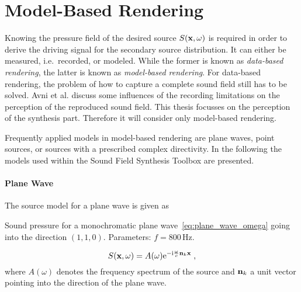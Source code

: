 \newpage

\section{Model-Based Rendering}
\label{sec:model_based_rendering}
%
Knowing the pressure field of the desired source $S(\mathbf{x},\omega)$ is required
in order to derive the driving signal for the secondary source distribution.
It can either be measured, i.e.~recorded, or modeled. While the former is known as
{\em data-based rendering},
the latter is known as {\em model-based rendering}.
For data-based rendering, the problem of how to capture a complete sound field
still has to be solved. Avni et al. discuss some influences of the
recording limitations on the perception of the reproduced sound field.\autocite{Avni2013}
This thesis focusses on the perception of the synthesis part. Therefore it
will consider only model-based rendering.

Frequently applied models in model-based rendering are plane waves, point
sources, or sources with a prescribed complex directivity.
In the following the models used within the Sound Field Synthesis
Toolbox are presented.
%
\paragraph{Plane Wave}
\label{sec:plane_wave}
%
The source model for a plane wave is given
as
%
\begin{marginfigure}
    \centering
    \ft
    
    \caption{Sound pressure for a monochromatic plane
        wave~\eqref{eq:plane_wave_omega} going into the
        direction $(1,1,0)$. Parameters: $f = 800$\,Hz.
        }
\end{marginfigure}
%
\begin{equation} 
    S(\x,\omega) = A(\omega) \E^{-\I\omegac \n_k \x}
    \qc
    \label{eq:plane_wave_omega}
\end{equation}
%
where $A(\omega)$ denotes the frequency spectrum of the source
and $\mathbf{n}_k$ a unit vector pointing into the direction of
the plane wave.

